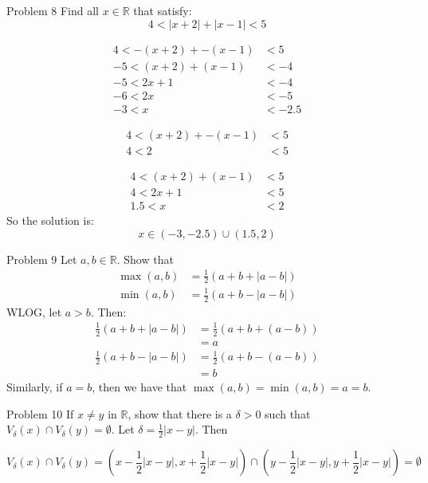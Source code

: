 \documentclass[10pt]{extarticle}
\newcommand{\R}{\mathbb{R}}
\begin{document}
  \begin{problem}{Problem 8}
    Find all $x\in\R$ that satisfy:
    \[
      4 < |x+2| + |x-1| < 5
    \] 
    \tcblower
    \begin{description}[font=\scshape]
      \item[Case 1: $x < -2$]
    \end{description}
    \begin{align*}
      4 < -(x+2) + -(x-1) &<5\\
      -5<(x+2) + (x-1) &< -4\\
      -5 < 2x+1 &< -4 \\
      -6 < 2x &< -5 \\
      -3 < x &< -2.5
    \end{align*}
    \begin{description}[font=\scshape]
      \item[Case 2: $-2\leq x < 1$]
    \end{description}
    \begin{align*}
      4 < (x+2) + -(x-1) &<5\\
      4 < 2 &< 5 \tag*{$\bot$}
    \end{align*}
    \begin{description}[font=\scshape]
      \item[Case 3: $1 \leq x$]
    \end{description}
    \begin{align*}
      4 < (x+2) + (x-1) &<5\\
      4 < 2x+1 &< 5\\
      1.5 < x &< 2
    \end{align*}
    So the solution is:
    \[
      x\in (-3,-2.5) \cup (1.5,2)
    \] 
  \end{problem}
  \begin{problem}{Problem 9}
    Let $a,b\in\R$. Show that
    \begin{align*}
      \max(a,b) &= \frac{1}{2}(a+b+|a-b|)\\
      \min(a,b) &= \frac{1}{2}(a+b-|a-b|)
    \end{align*}
    \tcblower
    WLOG, let $a > b$. Then:
    \begin{align*}
      \frac{1}{2}(a + b + |a-b|) &= \frac{1}{2}(a + b + (a-b)) \\
                                 &= a\\
      \frac{1}{2}(a+b-|a-b|) &= \frac{1}{2}(a+b-(a-b))\\
                             &= b
    \end{align*}
    Similarly, if $a = b$, then we have that $\max(a,b) = \min(a,b) = a = b$.
  \end{problem}
  \begin{problem}{Problem 10}
    If $x\neq y$ in $\R$, show that there is a $\delta > 0$ such that $V_{\delta}(x) \cap V_{\delta}(y) = \emptyset$.
    \tcblower
  Let $\delta = \frac{1}{2}|x-y|$. Then

  \[V_{\delta}(x) \cap V_{\delta}(y) = \left(x-\frac{1}{2}|x-y|,x+\frac{1}{2}|x-y|\right)\cap \left(y-\frac{1}{2}|x-y|,y+\frac{1}{2}|x-y|\right) = \emptyset\]
  \end{problem}
\end{document}
